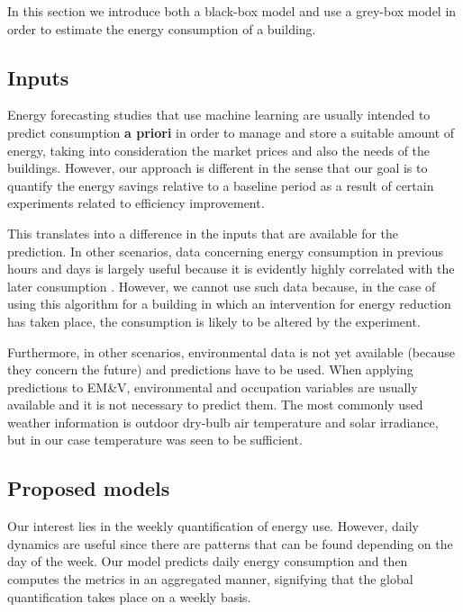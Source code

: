 \documentclass[10pt, conference, compsocconf]{IEEEtran}
\begin{document}
In this section we introduce both a black-box model and use a grey-box model in order to estimate the energy consumption of a building.

\subsection{Inputs}


Energy forecasting studies that use machine learning are usually intended to predict consumption \textbf{a priori} in order to manage and store a suitable amount of energy, taking into consideration the market prices and also the needs of the buildings. However, our approach is different in the sense that our goal is to quantify the energy savings relative to a baseline period as a result of certain experiments related to efficiency improvement. 

This translates into a difference in the inputs that are available for the prediction. In other scenarios, data concerning energy consumption in previous hours and days is largely useful because it is evidently highly correlated with the later consumption \cite{aman2014empirical}. However, we cannot use such data because, in the case of using this algorithm for a building in which an intervention for energy reduction has taken place, the consumption is likely to be altered by the experiment.

Furthermore, in other scenarios, environmental data is not yet available (because they concern the future) and predictions have to be used. When applying predictions to EM\&V, environmental and occupation variables are usually available and it is not necessary to predict them. The most commonly used weather information is outdoor dry-bulb air temperature and solar irradiance, but in our case temperature was seen to be sufficient.



\subsection{Proposed models}

Our interest lies in the weekly quantification of energy use. However, daily dynamics are useful since there are patterns that can be found depending on the day of the week. Our model predicts daily energy consumption and then computes the metrics in an aggregated manner, signifying that the global quantification takes place on a weekly basis.
\end{document}
